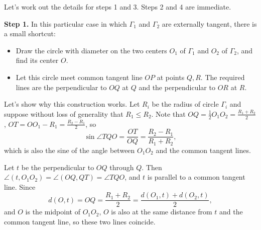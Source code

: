 \documentclass[12pt,oneside,a4paper]{book}
\begin{document}
Let's work out the details for steps 1 and 3. Steps 2 and 4 are immediate.

\smallskip
\textbf{Step 1.} In this particular case in which $\Gamma_1$ and $\Gamma_2$ are externally tangent, there is a small shortcut:
\begin{itemize}
\item Draw the circle with diameter on the two centers $O_1$ of $\Gamma_1$ and $O_2$ of $\Gamma_2$, and find its center $O$.
\item Let this circle meet common tangent line $OP$ at points $Q,R$. The required lines are the perpendicular to $OQ$ at $Q$ and the perpendicular to $OR$ at $R$.
\end{itemize}

\begin{center}
\end{center}

Let's show why this construction works. Let $R_i$ be the radius of circle $\Gamma_i$ and suppose without loss of generality that $R_1 \le R_2$. Note that $OQ = \frac12 O_1O_2 = \frac{R_1+R_2}2$, $OT = OO_1 - R_1 = \frac{R_2-R_1}2$, so
\[\sin\angle TQO = \frac{OT}{OQ} = \frac{R_2-R_1}{R_1+R_2},\]
which is also the sine of the angle between $O_1O_2$ and the common tangent lines.

Let $t$ be the perpendicular to $OQ$ through $Q$. Then $\angle(t,O_1O_2) = \angle(OQ,QT) = \angle TQO$, and $t$ is parallel to a common tangent line. Since
\[d(O,t) = OQ = \frac{R_1+R_2}2 = \frac{d(O_1,t)+d(O_2,t)}2,\]
and $O$ is the midpoint of $O_1O_2$, $O$ is also at the same distance from $t$ and the common tangent line, so these two lines coincide.
\end{document}
